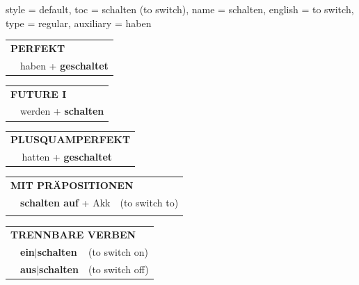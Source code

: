 \begin{verbentry}{
  style = {default},
  toc = {schalten (to switch)},
  name = {schalten},
  english = {to switch},
  type = {regular},
  auxiliary = {haben}
}
\vspace{10pt}

\begin{tabular}{rl}
\multicolumn{2}{l}{\textbf{PERFEKT}}\\
& haben + \textbf{geschaltet}\\
\end{tabular}
\hfill
\begin{tabular}{rl}
\multicolumn{2}{l}{\textbf{FUTURE I}}\\
& werden + \textbf{schalten}\\
\end{tabular}
\hfill
\begin{tabular}{rl}
\multicolumn{2}{l}{\textbf{PLUSQUAMPERFEKT}}\\
& hatten + \textbf{geschaltet}\\
\end{tabular}

\vspace{10pt}

\begin{tabular}{lll}
\multicolumn{3}{l}{\textbf{MIT PRÄPOSITIONEN}}\\
& \textbf{schalten auf} + Akk & (to switch to)\\
\vspace{10pt}
\end{tabular}
\hfill
\begin{tabular}{lll}
\multicolumn{3}{l}{\textbf{TRENNBARE VERBEN}}\\
& \textbf{ein$|$schalten} & (to switch on)\\
& \textbf{aus$|$schalten} & (to switch off)\\
\end{tabular}

\vspace{-5pt}
\end{verbentry}

